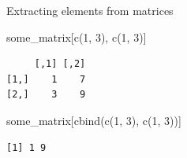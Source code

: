 \documentclass[
  ignorenonframetext,
  aspectratio=169,
]{beamer}
\newenvironment{Shaded}{\begin{snugshade}}{\end{snugshade}}
\newcommand{\DecValTok}[1]{\textcolor[rgb]{0.68,0.00,0.00}{#1}}
\newcommand{\FunctionTok}[1]{\textcolor[rgb]{0.28,0.35,0.67}{#1}}
\newcommand{\NormalTok}[1]{\textcolor[rgb]{0.00,0.23,0.31}{#1}}
\begin{document}
\begin{frame}[fragile]{Extracting elements from matrices}
\protect{}\label{extracting-elements-from-matrices-1}
\footnotesize

\begin{Shaded}
\begin{Highlighting}[]
\NormalTok{some\_matrix[}\FunctionTok{c}\NormalTok{(}\DecValTok{1}\NormalTok{, }\DecValTok{3}\NormalTok{), }\FunctionTok{c}\NormalTok{(}\DecValTok{1}\NormalTok{, }\DecValTok{3}\NormalTok{)]}
\end{Highlighting}
\end{Shaded}

\begin{verbatim}
     [,1] [,2]
[1,]    1    7
[2,]    3    9
\end{verbatim}

\begin{Shaded}
\begin{Highlighting}[]
\NormalTok{some\_matrix[}\FunctionTok{cbind}\NormalTok{(}\FunctionTok{c}\NormalTok{(}\DecValTok{1}\NormalTok{, }\DecValTok{3}\NormalTok{), }\FunctionTok{c}\NormalTok{(}\DecValTok{1}\NormalTok{, }\DecValTok{3}\NormalTok{))]}
\end{Highlighting}
\end{Shaded}

\begin{verbatim}
[1] 1 9
\end{verbatim}

\normalsize
\end{frame}
\end{document}
